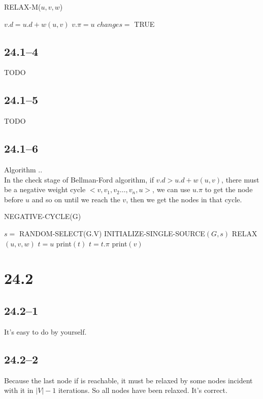 \documentclass{article}
\begin{document}
\begin{algorithm}
  \caption{RELAX-M($u, v, w$)}
  \begin{algorithmic}[1]
    \STATE $v.d = u.d + w(u, v)$
    \STATE $v.\pi = u$
    \STATE $changes =$ TRUE
    \ENDIF
  \end{algorithmic}
\end{algorithm}

\subsection*{24.1--4}
TODO

\subsection*{24.1--5}
TODO

\subsection*{24.1--6}
Algorithm ..\\
In the check stage of Bellman-Ford algorithm, if $v.d > u.d + w(u, v)$, there must be a negative weight cycle $<v, v_1, v_2\ldots{},v_n, u>$, we can use $u.\pi$ to get the node before $u$ and so on until we reach the $v$, then we get the nodes in that cycle.
\begin{algorithm}
  \caption{NEGATIVE-CYCLE(G)}
  \begin{algorithmic}[1]
    \STATE $s =$ RANDOM-SELECT(G.V)
    \STATE INITIALIZE-SINGLE-SOURCE$(G, s)$
    \STATE RELAX$(u, v, w)$
    \ENDFOR
    \ENDFOR
    \STATE $t = u$
    \STATE print$(t)$
    \STATE $t = t.\pi$
    \ENDWHILE
    \STATE print$(v)$
    \ENDIF
    \ENDFOR
  \end{algorithmic}
\end{algorithm}

\section*{24.2}
\subsection*{24.2--1}
It's easy to do by yourself.

\subsection*{24.2--2}
Because the last node if is reachable, it must be relaxed by some nodes
incident with it in $|V| - 1$ iterations. So all nodes have been relaxed.
It's correct.
\end{document}
